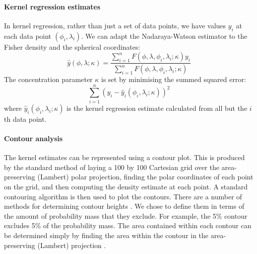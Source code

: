 \documentclass[10pt]{article}
\begin{document}
\paragraph{Kernel regression estimates}
\label{retistruct_plos:sec:kern-regr-estim}

In kernel regression, rather than just a set of data points, we have
values $y_i$ at each data point $(\phi_i, \lambda_i)$. We can adapt
the Nadaraya-Watson estimator \cite{Nada64esti,Watt1964smoo} to the
Fisher density and the spherical coordinates:
\begin{equation}
  \label{kernel-density:eq:4}
    \hat y(\phi,\lambda;\kappa) = \frac{\sum_{i=1}^n F(\phi, \lambda, \phi_i, \lambda_i; \kappa)y_i}{\sum_{i=1}^n F(\phi, \lambda, \phi_i, \lambda_i; \kappa)}
\end{equation}
The concentration parameter $\kappa$ is set by minimising the summed
squared error:
\begin{equation}
  \label{kernel-density:eq:2}
  \sum_{i=1}^n (y_i - \hat y_{i}(\phi_i, \lambda_i;\kappa))^2
\end{equation}
where $\hat y_{i}(\phi_i, \lambda_i;\kappa)$ is the kernel regression
estimate calculated from all but the $i$th data point.


\paragraph{Contour analysis}
\label{retistruct_plos:sec:contouring}

The kernel estimates can be represented using a contour plot. This is
produced by the standard method \cite{FishEtal87spat} of laying a 100
by 100 Cartesian grid over the area-preserving (Lambert) polar
projection, finding the polar coordinates of each point on the grid,
and then computing the density estimate at each point.  A standard
contouring algorithm is then used to plot the contours.  There are a
number of methods for determining contour heights
\cite{FishEtal87spat}. We chose to define them in terms of the amount
of probability mass that they exclude. For example, the 5\% contour
excludes 5\% of the probability mass.  The area contained within each
contour can be determined simply by finding the area within the
contour in the area-preserving (Lambert) projection
\cite{FishEtal87spat}.
\end{document}
